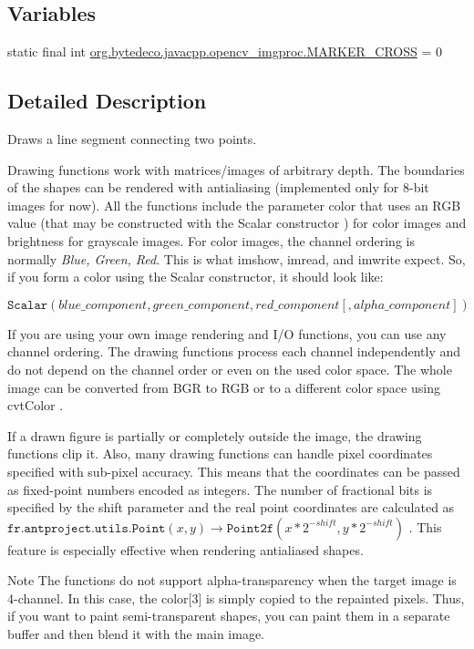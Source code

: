 \subsection*{Variables}
\begin{DoxyCompactItemize}
\item 
static final int \hyperlink{group__imgproc__draw_gad3b5af2fc44e8c67ac0c7f607d59d724}{org.\+bytedeco.\+javacpp.\+opencv\+\_\+imgproc.\+M\+A\+R\+K\+E\+R\+\_\+\+C\+R\+O\+SS} = 0
\end{DoxyCompactItemize}


\subsection{Detailed Description}
Draws a line segment connecting two points. 

Drawing functions work with matrices/images of arbitrary depth. The boundaries of the shapes can be rendered with antialiasing (implemented only for 8-\/bit images for now). All the functions include the parameter color that uses an R\+GB value (that may be constructed with the Scalar constructor ) for color images and brightness for grayscale images. For color images, the channel ordering is normally {\itshape Blue, Green, Red}. This is what imshow, imread, and imwrite expect. So, if you form a color using the Scalar constructor, it should look like\+: 

\[\texttt{Scalar} (blue \_ component, green \_ component, red \_ component[, alpha \_ component])\] 

If you are using your own image rendering and I/O functions, you can use any channel ordering. The drawing functions process each channel independently and do not depend on the channel order or even on the used color space. The whole image can be converted from B\+GR to R\+GB or to a different color space using cvt\+Color . 

If a drawn figure is partially or completely outside the image, the drawing functions clip it. Also, many drawing functions can handle pixel coordinates specified with sub-\/pixel accuracy. This means that the coordinates can be passed as fixed-\/point numbers encoded as integers. The number of fractional bits is specified by the shift parameter and the real point coordinates are calculated as $\texttt{fr.antproject.utils.Point}(x,y)\rightarrow\texttt{Point2f}(x*2^{-shift},y*2^{-shift})$ . This feature is especially effective when rendering antialiased shapes.

\begin{DoxyNote}{Note}
The functions do not support alpha-\/transparency when the target image is 4-\/channel. In this case, the color\mbox{[}3\mbox{]} is simply copied to the repainted pixels. Thus, if you want to paint semi-\/transparent shapes, you can paint them in a separate buffer and then blend it with the main image. 
\end{DoxyNote}



